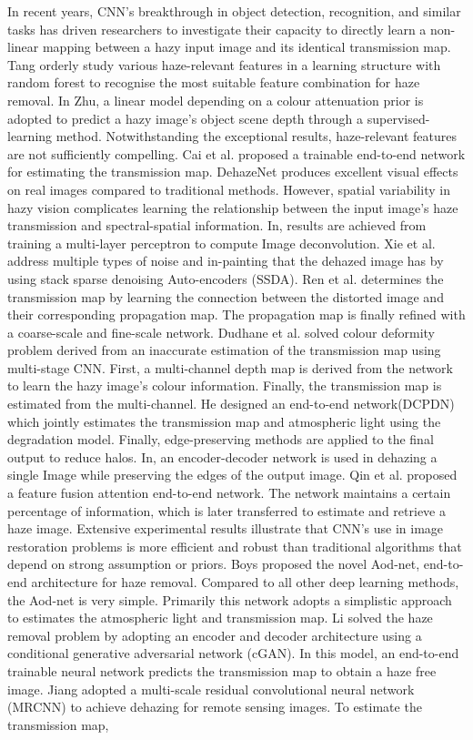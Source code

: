 \documentclass[doctor,english,listoffigures,listoftables]{thesis-uestc}
\begin{document}
In recent years, CNN's breakthrough in object detection, recognition, and similar tasks has driven researchers to investigate their capacity to directly learn a non-linear mapping between a hazy input image and its identical transmission map. Tang orderly study various haze-relevant features in a learning structure with random forest to recognise the most suitable feature combination for haze removal. In Zhu, a linear model depending on a colour attenuation prior is adopted to predict a hazy image's object scene depth through a supervised-learning method. Notwithstanding the exceptional results, haze-relevant features are not sufficiently compelling. Cai et al. proposed a trainable end-to-end network for estimating the transmission map. DehazeNet produces excellent visual effects on real images compared to traditional methods. However, spatial variability in hazy vision complicates learning the relationship between the input image's haze transmission and spectral-spatial information. In, results are achieved from training a multi-layer perceptron to compute Image deconvolution. Xie et al. address multiple types of noise and in-painting that the dehazed image has by using stack sparse denoising Auto-encoders (SSDA). Ren et al. determines the transmission map by learning the connection between the distorted image and their corresponding propagation map. The propagation map is finally refined with a coarse-scale and fine-scale network. Dudhane et al. solved colour deformity problem derived from an inaccurate estimation of the transmission map using multi-stage CNN. First, a multi-channel depth map is derived from the network to learn the hazy image's colour information. Finally, the transmission map is estimated from the multi-channel. He designed an end-to-end network(DCPDN) which jointly estimates the transmission map and atmospheric light using the degradation model. Finally, edge-preserving methods are applied to the final output to reduce halos. In, an encoder-decoder network is used in dehazing a single Image while preserving the edges of the output image. Qin et al. proposed a feature fusion attention end-to-end network. The network maintains a certain percentage of information, which is later transferred to estimate and retrieve a haze image. Extensive experimental results illustrate that CNN's use in image restoration problems is more efficient and robust than traditional algorithms that depend on strong assumption or priors. Boys proposed the novel Aod-net, end-to-end architecture for haze removal. Compared to all other deep learning methods, the Aod-net is very simple. Primarily this network adopts a simplistic approach to estimates the atmospheric light and transmission map. Li solved the haze removal problem by adopting an encoder and decoder architecture using a conditional generative adversarial network (cGAN). In this model, an end-to-end trainable neural network predicts the transmission map to obtain a haze free image. Jiang adopted a multi-scale residual convolutional neural network (MRCNN) to achieve dehazing for remote sensing images. To estimate the transmission map, 
\end{document}
